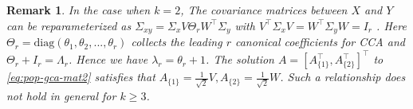 \documentclass[11pt]{article}
\newcommand{\nb}[1]{\textcolor{orange}{\texttt{[#1]}}}
\newcommand{\dc}[1]{\{#1\}} %
\newcommand{\0}{{\mathbf{0}}}
\newtheorem{remark}[theorem]{Remark}
\begin{document}
%
%
%
\begin{remark}
      \label{rmk:cca}
In the case when $k=2$, The covariance matrices between $X$ and $Y$ can be reparameterized as $\Sigma_{xy}=\Sigma_xV{\Theta_r} W^\top\Sigma_y$ with $V^\top \Sigma_xV=W^\top \Sigma_yW= { I_r}$ \cite{gao2015minimax,gao2017sparse}. 
{Here $\Theta_r=\mathrm{diag}(\theta_1,\theta_2,...,\theta_r)$ collects the leading $r$ canonical coefficients for CCA and $\Theta_r +I_r= \Lambda_r$. Hence we have $\lambda_r = \theta_r+1$.}
The solution $A=[{ A_{\dc{1}}^\top}, {A_{\dc{2}}^\top}]^\top$ to \eqref{eq:pop-gca-mat2} satisfies that $A_{\dc{1}}=\frac{1}{\sqrt{2}}V, A_{\dc{2}}=\frac{1}{\sqrt{2}}W$. 
Such a relationship does not hold in general for $k\geq 3$.
\end{remark}
\end{document}

